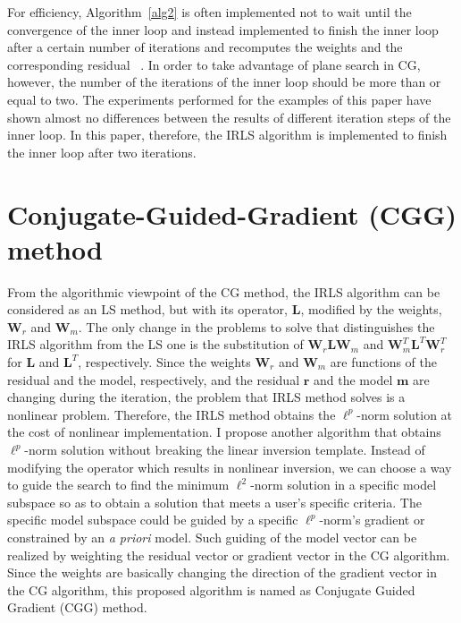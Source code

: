 For efficiency, Algorithm~\ref{alg2} is often implemented not to 
wait until the convergence of the inner loop
and instead implemented to finish the inner loop
after a certain number of iterations 
and recomputes the weights and the corresponding residual
~\cite{Darche.sep.61.281,Nichols.sep.82.1}. 
In order to take advantage of plane search in CG,
however, the number of the iterations of the inner loop 
should be more than or equal to two.
The experiments performed for the examples of this paper have shown 
almost no differences between the results of different iteration steps
of the inner loop. In this paper, therefore, the IRLS algorithm is implemented
to finish the inner loop after two iterations.

\section{Conjugate-Guided-Gradient (CGG) method}
From the algorithmic viewpoint of the CG method,
the IRLS algorithm can be considered as an LS method,
but with its operator, $\mathbf L$, modified by the weights, $\mathbf W_r$ and $\mathbf W_m$.
The only change in the problems to solve that distinguishes the IRLS algorithm 
from the LS one is the substitution of 
$\mathbf W_r \mathbf L\mathbf W_m$ and $\mathbf W_m^T\mathbf L^T \mathbf W_r^T$ 
for $\mathbf L$ and $\mathbf L^T$, respectively.
Since the weights $\mathbf W_r$ and $\mathbf W_m$ are functions of the residual and the model, respectively,
and the residual $\mathbf r$ and the model $\mathbf m$ are changing during the iteration, 
the problem that IRLS method solves is a nonlinear problem. 
Therefore, the IRLS method obtains the $\ell^p$-norm solution at the cost of nonlinear implementation.
I propose another algorithm that obtains $\ell^p$-norm solution
without breaking the linear inversion template.
Instead of modifying the operator which results in nonlinear inversion,
we can choose a way to guide the search 
to find the minimum $\mathbf \ell^2$-norm solution in a specific model subspace
so as to obtain a solution that meets a user's specific criteria.
The specific model subspace could be 
guided by a specific $\mathbf \ell^p$-norm's gradient 
or constrained by an {\it a priori} model.
Such guiding of the model vector can be realized by
weighting the residual vector or gradient vector in the CG algorithm.
Since the weights are basically changing the direction of the gradient vector in the CG algorithm, 
this proposed algorithm is named as Conjugate Guided Gradient (CGG) method.


